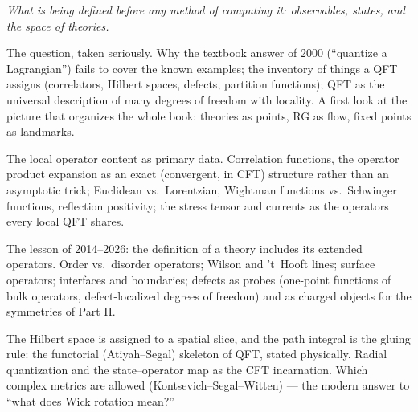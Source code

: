 \noin \emph{What is being defined before any method of computing it: observables, states, and the space of theories.}

The question, taken seriously. Why the textbook answer of 2000 (``quantize a Lagrangian'') fails to cover the known examples; the inventory of things a QFT assigns (correlators, Hilbert spaces, defects, partition functions); QFT as the universal description of many degrees of freedom with locality. A first look at the picture that organizes the whole book: theories as points, RG as flow, fixed points as landmarks.

The local operator content as primary data. Correlation functions, the operator product expansion as an exact (convergent, in CFT) structure rather than an asymptotic trick; Euclidean vs.\ Lorentzian, Wightman functions vs.\ Schwinger functions, reflection positivity; the stress tensor and currents as the operators every local QFT shares.

The lesson of 2014--2026: the definition of a theory includes its extended operators. Order vs.\ disorder operators; Wilson and 't~Hooft lines; surface operators; interfaces and boundaries; defects as probes (one-point functions of bulk operators, defect-localized degrees of freedom) and as charged objects for the symmetries of Part II.

The Hilbert space is assigned to a spatial slice, and the path integral is the gluing rule: the functorial (Atiyah--Segal) skeleton of QFT, stated physically. Radial quantization and the state--operator map as the CFT incarnation. Which complex metrics are allowed (Kontsevich--Segal--Witten) --- the modern answer to ``what does Wick rotation mean?''

